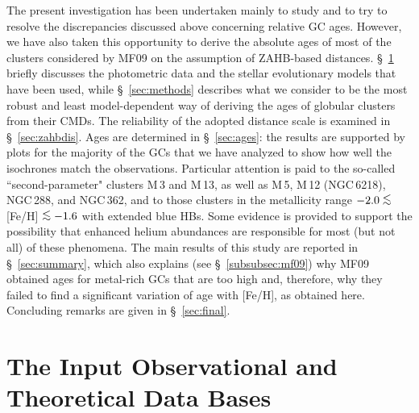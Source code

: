 \documentclass[12pt,preprint]{aastex}
\newcommand\lta{\mathrel{\hbox{\raise 0.6 ex \hbox{$<$}\kern
                   -1.8 ex\lower .5 ex\hbox{$\sim$}}}}
\begin{document}
The present investigation has been undertaken mainly to study and to try to
resolve the discrepancies discussed above concerning relative GC ages. 
However, we have also taken this opportunity to derive the absolute ages of
most of the clusters considered by MF09 on the assumption of ZAHB-based
distances.  \S~\ref{sec:input} briefly discusses the photometric data and the
stellar evolutionary models that have been used, while \S~\ref{sec:methods}
describes what we consider to be the most robust and least model-dependent way
of deriving the ages of globular clusters from their CMDs.  The reliability of
the adopted distance scale is examined in \S~\ref{sec:zahbdis}.  Ages
are determined in \S~\ref{sec:ages}: the results are supported by
plots for the majority of the GCs that we have analyzed to show how well the
isochrones match the observations.  Particular attention is paid to the
so-called ``second-parameter" clusters M$\,$3 and M$\,$13, as well as M$\,$5,
M$\,$12 (NGC$\,$6218), NGC$\,$288, and NGC$\,$362, and to those clusters in the
metallicity range $-2.0 \lta$ [Fe/H] $\lta -1.6$ with extended blue HBs.  Some
evidence is provided to support the possibility that enhanced helium abundances
are responsible for most (but not all) of these phenomena.  The main results of
this study are reported in \S~\ref{sec:summary}, which also explains (see
\S~\ref{subsubsec:mf09}) why MF09 obtained ages for metal-rich GCs that are too
high and, therefore, why they failed to find a significant variation of age with
[Fe/H], as obtained here.  Concluding remarks are given in \S~\ref{sec:final}.

\section{The Input Observational and Theoretical Data Bases}
\label{sec:input}
\end{document}

